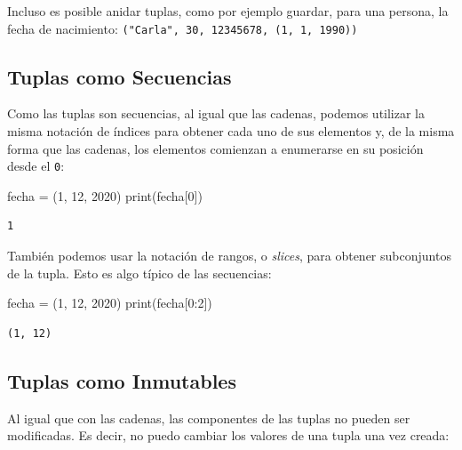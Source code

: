 \documentclass[
  letterpaper,
  DIV=11,
  numbers=noendperiod]{scrreprt}
\newenvironment{Shaded}{\begin{snugshade}}{\end{snugshade}}
\newcommand{\BuiltInTok}[1]{\textcolor[rgb]{0.00,0.23,0.31}{#1}}
\newcommand{\DecValTok}[1]{\textcolor[rgb]{0.68,0.00,0.00}{#1}}
\newcommand{\NormalTok}[1]{\textcolor[rgb]{0.00,0.23,0.31}{#1}}
\newcommand{\OperatorTok}[1]{\textcolor[rgb]{0.37,0.37,0.37}{#1}}
\begin{document}
Incluso es posible anidar tuplas, como por ejemplo guardar, para una
persona, la fecha de nacimiento:
\texttt{("Carla",\ 30,\ 12345678,\ (1,\ 1,\ 1990))}

\subsection{Tuplas como Secuencias}\label{tuplas-como-secuencias}

Como las tuplas son secuencias, al igual que las cadenas, podemos
utilizar la misma notación de índices para obtener cada uno de sus
elementos y, de la misma forma que las cadenas, los elementos comienzan
a enumerarse en su posición desde el \texttt{0}:

\begin{Shaded}
\begin{Highlighting}[]
\NormalTok{fecha }\OperatorTok{=}\NormalTok{ (}\DecValTok{1}\NormalTok{, }\DecValTok{12}\NormalTok{, }\DecValTok{2020}\NormalTok{)}
\BuiltInTok{print}\NormalTok{(fecha[}\DecValTok{0}\NormalTok{])}
\end{Highlighting}
\end{Shaded}

\begin{verbatim}
1
\end{verbatim}

También podemos usar la notación de rangos, o \emph{slices}, para
obtener subconjuntos de la tupla. Esto es algo típico de las secuencias:

\begin{Shaded}
\begin{Highlighting}[]
\NormalTok{fecha }\OperatorTok{=}\NormalTok{ (}\DecValTok{1}\NormalTok{, }\DecValTok{12}\NormalTok{, }\DecValTok{2020}\NormalTok{)}
\BuiltInTok{print}\NormalTok{(fecha[}\DecValTok{0}\NormalTok{:}\DecValTok{2}\NormalTok{])}
\end{Highlighting}
\end{Shaded}

\begin{verbatim}
(1, 12)
\end{verbatim}

\subsection{Tuplas como Inmutables}\label{tuplas-como-inmutables}

Al igual que con las cadenas, las componentes de las tuplas no pueden
ser modificadas. Es decir, no puedo cambiar los valores de una tupla una
vez creada:
\end{document}
